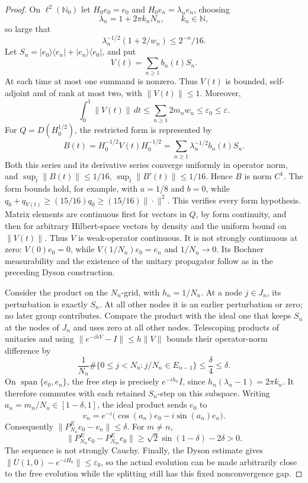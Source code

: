 \documentclass[11pt,a4paper]{article}
\theoremstyle{remark}
\begin{document}
\begin{proof}
On $\ell^2(\mathbb N_0)$ let $H_0e_0=e_0$ and
$H_0e_n=\lambda_ne_n$, choosing
\[
 \lambda_n=1+2\pi k_nN_n,\qquad k_n\in\mathbb N,
\]
so large that
\[
 \lambda_n^{-1/2}(1+2/w_n)\le2^{-n}/16.
\]
Let $S_n=|e_0\rangle\langle e_n|+|e_n\rangle\langle e_0|$, and put
\[
 V(t)=\sum_{n\ge1}b_n(t)S_n.
\]
At each time at most one summand is nonzero. Thus $V(t)$ is bounded,
self-adjoint and of rank at most two, with $\|V(t)\|\le1$. Moreover,
\[
 \int_0^1\|V(t)\|\,dt
 \le\sum_{n\ge1}2m_nw_n\le\varepsilon_0\le\varepsilon.
\]
For $Q=D(H_0^{1/2})$, the restricted form is represented by
\[
 B(t)=H_0^{-1/2}V(t)H_0^{-1/2}
     =\sum_{n\ge1}\lambda_n^{-1/2}b_n(t)S_n.
\]
Both this series and its derivative series converge uniformly in
operator norm, and
$\sup_t\|B(t)\|\le1/16$, $\sup_t\|B'(t)\|\le1/16$.
Hence $B$ is norm $C^1$. The form bounds hold, for example, with
$a=1/8$ and $b=0$, while
$q_0+q_{V(t)}\ge(15/16)q_0\ge(15/16)\|\cdot\|^2$.
This verifies every form hypothesis. Matrix elements are continuous
first for vectors in $Q$, by form continuity, and then for arbitrary
Hilbert-space vectors by density and the uniform bound on $\|V(t)\|$.
Thus $V$ is weak-operator continuous. It is not strongly continuous
at zero: $V(0)e_0=0$, while $V(1/N_n)e_0=e_n$ and $1/N_n\to0$.
Its Bochner measurability and the existence of the unitary propagator
follow as in the preceding Dyson construction.

Consider the product on the $N_n$-grid, with $h_n=1/N_n$. At a node
$j\in J_n$, its perturbation is exactly $S_n$. At all other nodes it is
an earlier perturbation or zero; no later group contributes. Compare the
product with the ideal one that keeps $S_n$ at the nodes of $J_n$ and
uses zero at all other nodes. Telescoping products of unitaries and using
$\|e^{-ihV}-I\|\le h\|V\|$ bounds their operator-norm difference by
\[
 \frac1{N_n}\#\{0\le j<N_n:j/N_n\in E_{n-1}\}
 \le\frac\delta4\le\delta.
\]
On $\operatorname{span}\{e_0,e_n\}$, the free step is precisely
$e^{-ih_n}I$, since
$h_n(\lambda_n-1)=2\pi k_n$. It therefore commutes with each retained
$S_n$-step on this subspace. Writing $a_n=m_n/N_n\in[1-\delta,1]$,
the ideal product sends $e_0$ to
\[
 v_n=e^{-i}\bigl(\cos(a_n)e_0-i\sin(a_n)e_n\bigr).
\]
Consequently $\|P_{N_n}^Ee_0-v_n\|\le\delta$. For $m\ne n$,
\[
 \|P_{N_n}^Ee_0-P_{N_m}^Ee_0\|
 \ge\sqrt2\sin(1-\delta)-2\delta>0.
\]
The sequence is not strongly Cauchy. Finally, the Dyson estimate gives
$\|U(1,0)-e^{-iH_0}\|\le\varepsilon_0$, so the actual evolution can be
made arbitrarily close to the free evolution while the splitting still
has this fixed nonconvergence gap.
\end{proof}
\end{document}
